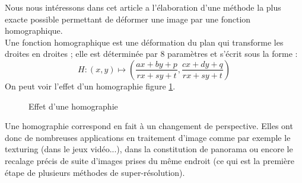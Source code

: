 



	Nous nous intéressons dans cet article a l'élaboration d'une méthode la plus exacte possible permettant de déformer une image par une fonction homographique. \\
 	Une fonction homographique est une déformation du plan qui transforme les droites en droites ; elle est déterminée par 8 paramètres et s'écrit sous la forme :
	\[H : (x,y)\mapsto\left( \frac{ax+by+p}{rx+sy+t},\frac{cx+dy+q}{rx+sy+t}\right)\] 
On peut voir l'effet d'un homographie figure \ref{effethom}.\\

 \begin{figure}
 
   \centering
    \arrowPDP 
   \caption{Effet d'une homographie}
\label{effethom}
 \end{figure}

	Une homographie correspond en fait à un changement de perspective. Elles ont donc de nombreuses applications en traitement d'image comme par exemple le texturing (dans le jeux vidéo...), dans la constitution de panorama ou encore le recalage précis de suite d'images prises du même endroit (ce qui est la première étape de plusieurs méthodes de super-résolution).


